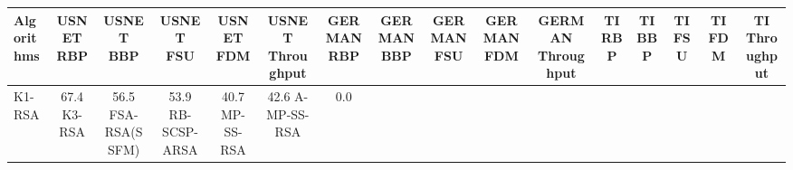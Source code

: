 \begin{tabular}{lccccccccccccccc}
\hline
Algorithms & USNET RBP & USNET BBP & USNET FSU & USNET FDM & USNET Throughput & GERMAN RBP & GERMAN BBP & GERMAN FSU & GERMAN FDM & GERMAN Throughput & TI RBP & TI BBP & TI FSU & TI FDM & TI Throughput \\
\hline
K1-RSA & 67.4%
K3-RSA & 56.5%
FSA-RSA(SSFM) & 53.9%
RB-SCSP-ARSA & 40.7%
MP-SS-RSA & 42.6%
A-MP-SS-RSA & 0.0%
\hline
\end{tabular}